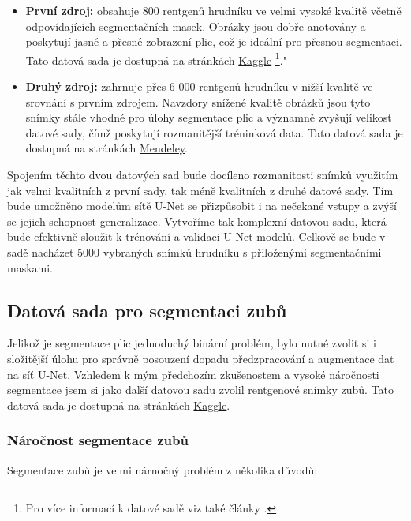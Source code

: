\documentclass[male,czech,api_ing]{thesis}
\begin{document}
\begin{itemize}
    \item \textbf{První zdroj:} obsahuje 800 rentgenů hrudníku ve velmi vysoké kvalitě včetně odpovídajících segmentačních masek. Obrázky jsou dobře anotovány a poskytují jasné a přesné zobrazení plic, což je ideální pro přesnou segmentaci. Tato datová sada je dostupná na stránkách \href{https://www.kaggle.com/datasets/nikhilpandey360/chest-xray-masks-and-labels}{Kaggle} \footnote{Pro více informací k datové sadě viz také články \cite{LungDatasetNeeded, LungDatasetNeeded2}.}."
    \item \textbf{Druhý zdroj:} zahrnuje přes 6 000 rentgenů hrudníku v nižší kvalitě ve srovnání s prvním zdrojem. Navzdory snížené kvalitě obrázků jsou tyto snímky stále vhodné pro úlohy segmentace plic a významně zvyšují velikost datové sady, čímž poskytují rozmanitější tréninková data. Tato datová sada je dostupná na stránkách \href{https://data.mendeley.com/datasets/8gf9vpkhgy/1}{Mendeley}. \cite{LungDataset2}
\end{itemize}

Spojením těchto dvou datových sad bude docíleno rozmanitosti snímků využitím jak velmi kvalitních z první sady, tak méně kvalitních z druhé datové sady. Tím bude umožněno modelům sítě U-Net se přizpůsobit i na nečekané vstupy a zvýší se jejich schopnost generalizace. Vytvoříme tak komplexní datovou sadu, která bude efektivně sloužit k trénování a validaci U-Net modelů. Celkově se bude v sadě nacházet 5000 vybraných snímků hrudníku s přiloženými segmentačními maskami.

\subsection{Datová sada pro segmentaci zubů}
Jelikož je segmentace plic jednoduchý binární problém, bylo nutné zvolit si i složitější úlohu pro správně posouzení dopadu předzpracování a augmentace dat na síť U-Net. Vzhledem k mým předchozím zkušenostem a vysoké náročnosti segmentace jsem si jako další datovou sadu zvolil rentgenové snímky zubů. Tato datová sada je dostupná na stránkách \href{https://www.kaggle.com/datasets/humansintheloop/teeth-segmentation-on-dental-x-ray-images}{Kaggle}. \cite{TeethDataset}

\subsubsection{Náročnost segmentace zubů}
Segmentace zubů je velmi nárnočný problém z několika důvodů:
\end{document}
